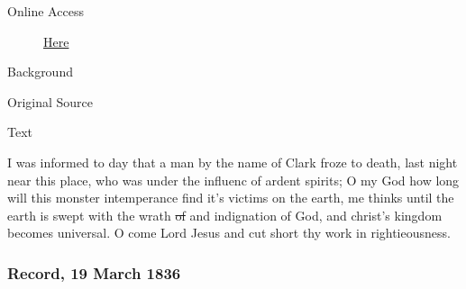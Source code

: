 				\begin{description}
					\item[Online Access] \href{https://www.josephsmithpapers.org/paper-summary/journal-1835-1836/170}{Here}
				\end{description}
				
				\begin{description}
					\item[Background]
				\end{description}
				
				
				\begin{description}
					\item[Original Source]
				\end{description}
				
				
				\begin{description}
					\item[Text]
				\end{description}
				
					I was informed to day that a man by the name of Clark froze to death, last night near this place, who was under the influenc of ardent spirits; O my God how long will this monster intemperance find it's victims on the earth, me thinks until the earth is swept with the wrath \sout{of} and indignation of God, and christ's kingdom becomes universal. O come Lord Jesus and cut short thy work in rightieousness.
					
		\subsubsection{Record, 19 March 1836}
			\label{EMS-1836-JS-19-MAR-1836}
			
